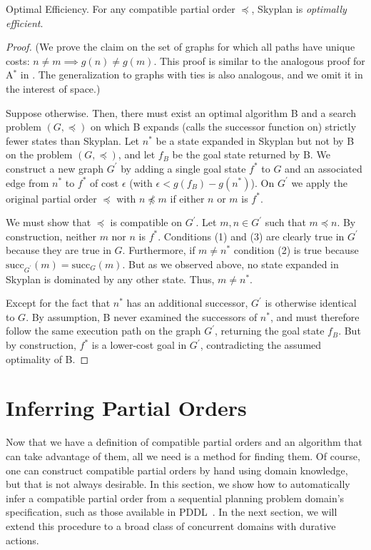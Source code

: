 \documentclass[letterpaper]{article}
\theoremstyle{plain} \newtheorem{theorem}{Theorem} \newtheorem{proposition}{Proposition} \newtheorem{lemma}{Lemma}
\theoremstyle{definition} \newtheorem{definition}{Definition} \newtheorem{conjecture}{Conjecture} \newtheorem*{example}{Example}
\theoremstyle{remark} \newtheorem*{remark}{Remark} \newtheorem*{note}{Note} \newtheorem{case}{Case}
\newcommand{\Astar}{A$^*$ }
\begin{document}
\begin{claim}{Optimal Efficiency.}\label{clm-optimally-efficient}
For any compatible partial order $\preceq$, Skyplan is \emph{optimally efficient}.
\end{claim}
\begin{proof} 
(We prove the claim on the set of graphs for which all paths have unique costs: $n \neq m \implies g(n) \neq g(m)$. This proof
is similar to the analogous proof for \Astar in \citet{astar}. The generalization to graphs with
ties is also analogous, and we omit it in the interest of space.)

Suppose otherwise. Then, there must exist an optimal algorithm B and a search problem $(G,\preceq)$ 
on which B expands (calls the successor function on) strictly fewer states than Skyplan. 
Let $n^{*}$ be a state expanded in Skyplan but not by B on the problem $(G,\preceq)$, and let
$f_{B}$ be the goal state returned by B. We construct a new graph $G^\prime$ by adding a single goal state $f^*$ to $G$ 
and an associated edge from $n^*$ to $f^*$ of cost $\epsilon$ (with $\epsilon < g(f_B)-g(n^*)$). 
On $G^\prime$ we apply the original partial order $\preceq$ with $n \npreceq m$ if either $n$ or $m$ is $f^*$.

We must show that $\preceq$ is compatible on $G^\prime$. 
Let $m,n \in G^\prime$ such that $m \preceq n$. By construction, neither $m$ nor $n$ is $f^*$. Conditions (1) and (3) %
are clearly true in $G^\prime$ because they are true in $G$.  Furthermore, if $m \neq n^*$ condition (2) is true %
because $\mathrm{succ}_{G^\prime}(m) = \mathrm{succ}_{G}(m)$. 
But as we observed above, no state expanded in Skyplan is
dominated by any other state. Thus, $m \neq n^*$.

Except for the fact that $n^*$ has an additional successor, $G^\prime$ is otherwise
 identical to $G$. By assumption, B never examined the successors of $n^*$, and 
must therefore follow the same execution path on the graph $G^\prime$, returning the goal state $f_B$.
But by construction, $f^*$ is a lower-cost goal in $G^\prime$, contradicting the assumed optimality of B.
 \end{proof}


\section{Inferring Partial Orders}

\newcommand{\po}{\preceq_R}

Now that we have a definition of compatible partial orders and an
algorithm that can take advantage of them, all we need is a method
for finding them. Of course, one can construct compatible partial orders by hand using
domain knowledge, but that is not always desirable. In this section, we
show how to automatically infer a compatible partial order from a
sequential planning problem domain's specification, such as those
available in PDDL~\citep{ghallab1998pddl,fox2003pddl2}. In the next
section, we will extend this procedure to a broad class of concurrent
domains with durative actions.
\end{document}
